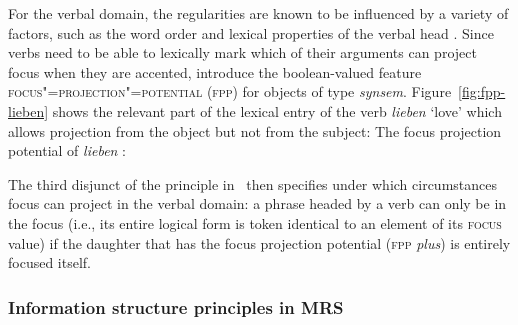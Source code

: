 \documentclass[output=paper
                ,modfonts
                ,nonflat
	        ,collection
	        ,collectionchapter
	        ,collectiontoclongg
 	        ,biblatex
                ,babelshorthands
                ,newtxmath
                ,draftmode
                ,colorlinks, citecolor=brown
]{./langsci/langscibook}
\begin{document}
For the verbal domain, the regularities are known to be influenced by
a variety of factors, such as the word order and lexical properties of
the verbal head \citep[cf., e.g., ][]{vSU86a}.  Since verbs
need to be able to lexically mark which of their arguments can project
focus when they are accented, \cite{dKM2003a} introduce the boolean-valued feature
\textsc{focus"=projection"=potential (fpp)} for objects of type
\textit{synsem}.  Figure~\ref{fig:fpp-lieben} shows the relevant part
of the lexical entry of the verb \textit{lieben} `love' which allows
projection from the object but not from the subject:
\ea
The focus projection potential of \textit{lieben} \citep{dKM2003a}:\\
  \begin{avm}
  \end{avm}
\label{fig:fpp-lieben}
\z
The third disjunct of the principle in~ then specifies under which circumstances
focus can project in the verbal domain: a phrase headed by a verb can
only be in the focus (i.e., its entire logical form is token identical
to an element of its \textsc{focus} value) if the daughter that has the focus
projection potential (\textsc{fpp} \textit{plus}) is entirely focused
itself.


\subsubsection{Information structure principles in MRS}
\end{document}
